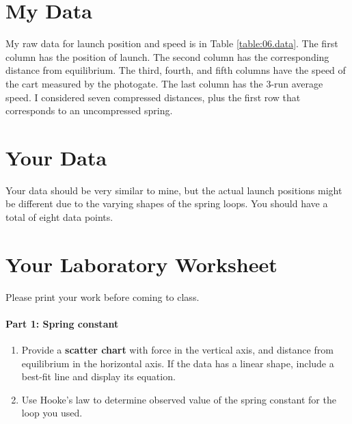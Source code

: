 \section{My Data}
%
My raw data for launch position and speed is in Table \ref{table:06.data}. The first column has the position of launch. The second column has the corresponding distance from equilibrium. The third, fourth, and fifth columns have the speed of the cart measured by the photogate. The last column has the 3-run average speed. I considered seven compressed distances, plus the first row that corresponds to an uncompressed spring.
%
\section{Your Data}
%
Your data should be very similar to mine, but the actual launch positions might be different due to the varying shapes of the spring loops. You should have a total of eight data points.
%
%
\newpage
\section{Your Laboratory Worksheet}
%
Please print your work before coming to class.
%
\paragraph{Part 1: Spring constant}
%
\begin{enumerate}
    \item Provide a \textbf{scatter chart} with force in the vertical axis, and distance from equilibrium in the horizontal axis. If the data has a linear shape, include a best-fit line and display its equation.
    \item Use Hooke's law to determine observed value of the spring constant for the loop you used.
\end{enumerate}
%
